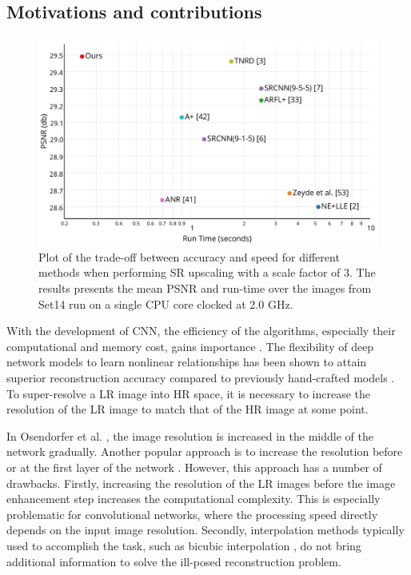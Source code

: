 \documentclass[10pt,twocolumn,letterpaper]{article}
\begin{document}
\subsection{Motivations and contributions}

\begin{figure}[htbp]
\begin{center}
\includegraphics[width=1.0\linewidth]{figures//accuracyvscomplexity.jpg}
\caption{Plot of the trade-off between accuracy and speed for different methods when performing \ac{SR} upscaling with a scale factor of 3. The results presents the mean \ac{PSNR} and run-time over the images from Set14 run on a single CPU core clocked at 2.0 GHz.}
\label{fig:accuracyvscomplexity}
\end{center}
\end{figure}

With the development of \ac{CNN}, the efficiency of the algorithms, especially their computational and memory cost, gains importance \cite{Szegedy43022}. The flexibility of deep network models to learn nonlinear relationships has been shown to attain superior reconstruction accuracy compared to previously hand-crafted models \cite{osendorfer2014image,dong2015image,wang2015deeply,schulter2015fast,chen2015trainable}. To  super-resolve a \ac{LR} image into \ac{HR} space, it is necessary to increase the resolution of the \ac{LR} image to match that of the \ac{HR} image at some point.

In Osendorfer et al. \cite{osendorfer2014image}, the image resolution is increased in the middle of the network gradually. Another popular approach is to increase the resolution before or at the first layer of the network \cite{dong2015image,wang2015deeply,chen2015trainable}. However, this approach has a number of drawbacks. Firstly, increasing the resolution of the \ac{LR} images before the image enhancement step increases the computational complexity. This is especially problematic for convolutional networks, where the processing speed directly depends on the input image resolution. Secondly, interpolation methods typically used to accomplish the task, such as bicubic interpolation \cite{dong2015image,wang2015deeply,chen2015trainable}, do not bring additional information to solve the ill-posed reconstruction problem.
\end{document}
